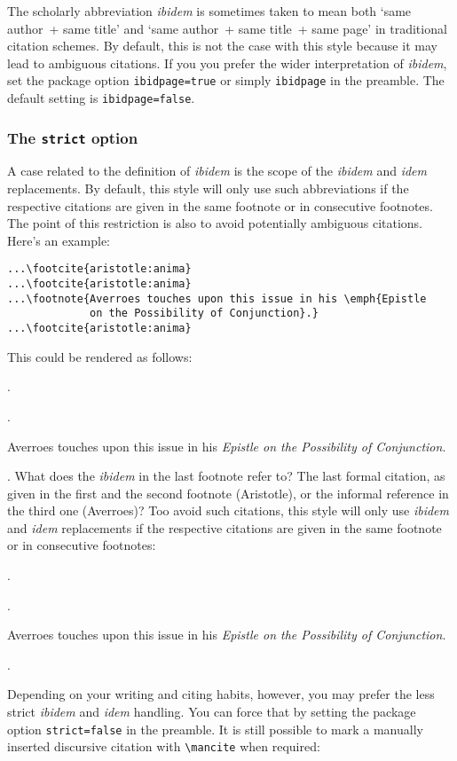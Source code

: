 \documentclass[a4paper]{article}
\newcommand*{\cmd}[1]{\texttt{\textbackslash #1}}
\newenvironment*{pseudofootnotes}
  {\list\labelenumi{%
     \def\makelabel##1{\hss\llap{##1}}%
     \def\labelenumi{\theenumi}%
     \usecounter{enumi}%
     \setlength{\leftmargin}{0pt}%
     \setlength{\labelsep}{0.75em}%
     \setlength{\itemsep}{0pt}%
     \setlength{\parsep}{0pt}}%
   \citereset
   \footnotesize
   \def\footcite##1{\item\Cite{##1}.}%
   \def\footnote##1{\item##1}}
  {\endlist}
\newenvironment*{pseudofootnotes*}
  {\pseudofootnotes
   \def\footnote##1{\item##1\mancite}}
  {\endpseudofootnotes}
\begin{document}
The scholarly abbreviation \emph{ibidem} is sometimes taken to mean
both `same author~+ same title' and `same author~+ same title~+ same
page' in traditional citation schemes. By default, this is not the
case with this style because it may lead to ambiguous citations. If
you you prefer the wider interpretation of \emph{ibidem}, set the
package option \texttt{ibidpage=true} or simply \texttt{ibidpage} in
the preamble. The default setting is \texttt{ibidpage=false}.

\subsubsection*{The \texttt{strict} option}

A case related to the definition of \emph{ibidem} is the scope of
the \emph{ibidem} and \emph{idem} replacements. By default, this
style will only use such abbreviations if the respective citations
are given in the same footnote or in consecutive footnotes. The
point of this restriction is also to avoid potentially ambiguous
citations. Here's an example:

\begin{verbatim}
...\footcite{aristotle:anima}
...\footcite{aristotle:anima}
...\footnote{Averroes touches upon this issue in his \emph{Epistle
             on the Possibility of Conjunction}.}
...\footcite{aristotle:anima}
\end{verbatim}
%
This could be rendered as follows:

\begin{pseudofootnotes}
\footcite{aristotle:anima}
\footcite{aristotle:anima}
\footnote{Averroes touches upon this issue in his \emph{Epistle on
the Possibility of Conjunction}.}
\footcite{aristotle:anima}
\end{pseudofootnotes}
%
What does the \emph{ibidem} in the last footnote refer to? The last
formal citation, as given in the first and the second footnote
(Aristotle), or the informal reference in the third one (Averroes)?
Too avoid such citations, this style will only use \emph{ibidem} and
\emph{idem} replacements if the respective citations are given in
the same footnote or in consecutive footnotes:

\begin{pseudofootnotes*}
\footcite{aristotle:anima}
\footcite{aristotle:anima}
\footnote{Averroes touches upon this issue in his \emph{Epistle on
the Possibility of Conjunction}.}
\footcite{aristotle:anima}
\end{pseudofootnotes*}
%
Depending on your writing and citing habits, however, you may prefer
the less strict \emph{ibidem} and \emph{idem} handling. You can
force that by setting the package option \texttt{strict=false} in
the preamble. It is still possible to mark a manually inserted
discursive citation with \cmd{mancite} when required:
\end{document}

